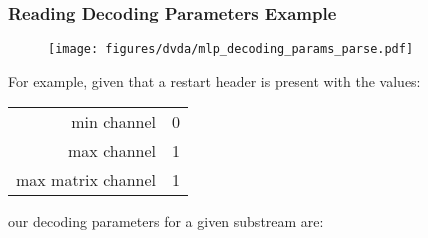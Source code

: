\clearpage

\subsubsection{Reading Decoding Parameters Example}

\begin{figure}[h]
  \texttt{[image: figures/dvda/mlp\_decoding\_params\_parse.pdf]}
\end{figure}

\clearpage

For example, given that a restart header is present with the values:
\begin{table}[h]
  {
    \begin{tabular}{rl}
      min channel & 0 \\
      max channel & 1 \\
      max matrix channel & 1 \\
    \end{tabular}
  }
\end{table}
\par
\noindent
our decoding parameters for a given substream are:
